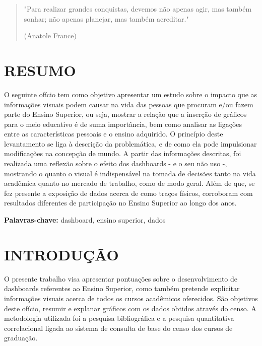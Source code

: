 \documentclass[a4paper,12pt]{article}
\begin{document}
\vspace{2cm}

\begin{quote}
    \centering
    "Para realizar grandes conquistas, devemos não apenas agir, mas também sonhar; não apenas planejar, mas também acreditar." 

    (Anatole France)
\end{quote}

\section{RESUMO}
O seguinte ofício tem como objetivo apresentar um estudo sobre o impacto que as informações visuais podem causar na vida das pessoas que procuram e/ou fazem parte do Ensino Superior, ou seja, mostrar a relação que a inserção de gráficos para o meio educativo é de suma importância, bem como analisar as ligações entre as características pessoais e o ensino adquirido. O princípio deste levantamento se liga à descrição da problemática, e de como ela pode impulsionar modificações na concepção de mundo. A partir das informações descritas, foi realizada uma reflexão sobre o efeito dos dashboards - e o seu não uso -, mostrando o quanto o visual é indispensável na tomada de decisões tanto na vida acadêmica quanto no mercado de trabalho, como de modo geral. Além de que, se fez presente a exposição de dados acerca de como traços físicos, corroboram com resultados diferentes de participação no Ensino Superior ao longo dos anos.

\textbf{Palavras-chave:} dashboard, ensino superior, dados

\newpage

\tableofcontents

\newpage

\section{INTRODUÇÃO}
O presente trabalho visa apresentar pontuações sobre o desenvolvimento de dashboards referentes ao Ensino Superior, como também pretende explicitar informações visuais acerca de todos os cursos acadêmicos oferecidos. São objetivos deste ofício, resumir e explanar gráficos com os dados obtidos através do censo. A metodologia utilizada foi a pesquisa bibliográfica e a pesquisa quantitativa correlacional ligada ao sistema de consulta de base do censo dos cursos de graduação.
\end{document}
